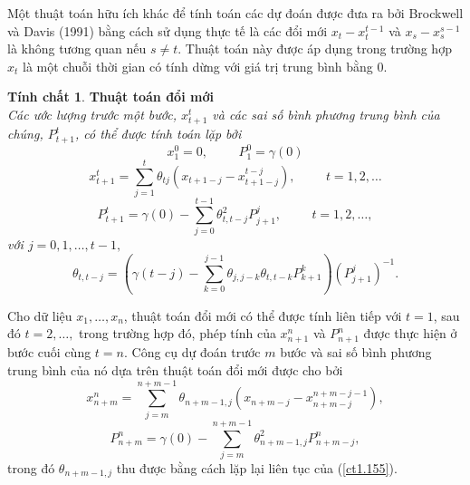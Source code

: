\documentclass[12pt, a4paper,oneside]{book}
\theoremstyle{definition}
\newtheorem{tc}[theo]{Tính chất}
\begin{document}
Một thuật toán hữu ích khác để tính toán các dự đoán được đưa ra bởi Brockwell và Davis (1991) bằng cách sử dụng thực tế là các đổi mới $x_{t} - x_{t}^{t-1}$ và $x_{s} - x_{s}^{s-1}$ là không tương quan nếu $s \neq t$. Thuật toán này được áp dụng trong trường hợp $x_{t}$ là một chuỗi thời gian có tính dừng với giá trị trung bình bằng $0$.
\begin{tc}\cite{8} \textbf{Thuật toán đổi mới}\\
	\textit{Các ước lượng trước một bước, $x_{t+1}^{t}$ và các sai số bình phương trung bình của chúng, $P_{t+1}^{t}$, có thể được tính toán lặp bởi
		$$x_{1}^{0}=0, \hspace{1cm} P_{1}^{0} =\gamma(0) $$
		\begin{equation}
		x_{t+1}^{t} = \sum_{j=1}^{t}\theta_{tj}(x_{t+1-j} - x_{t+1-j}^{t-j}), \hspace{1cm} t= 1,2, \dots \label{ct1.153}
		\end{equation}	
		\begin{equation}
		P_{t+1}^{t} = \gamma(0) - \sum_{j=0}^{t-1}\theta^{2}_{t,t-j}P_{j+1}^{j}, \hspace{1cm}  t=1, 2, \dots,\label{ct1.154}
		\end{equation}
		với $j=0, 1, \dots, t-1,$
		\begin{equation}
		\theta_{t,t-j}= (\gamma(t-j) - \sum_{k=0}^{j-1}\theta_{j,j-k}\theta_{t,t-k}P_{k+1}^{k})(P_{j+1}^{j})^{-1}.\label{ct1.155}
		\end{equation}}
\end{tc}

Cho dữ liệu $x_{1}, \dots, x_{n}$, thuật toán đổi mới có thể được tính liên tiếp với $t = 1$, sau đó $t = 2, \dots,$ trong trường hợp đó, phép tính của $x^{n}_{n+1}$ và $P^{n}_{n+1}$ được thực hiện ở bước cuối cùng $t = n$. Công cụ dự đoán trước $m$ bước và sai số bình phương trung bình của nó dựa trên thuật toán đổi mới được cho bởi
\begin{equation}
x_{n+m}^{n} = \sum_{j=m}^{n+m-1}\theta_{n+m-1,j}(x_{n+m-j}- x^{n+m-j-1}_{n+m-j}), \label{ct1.156}
\end{equation}
\begin{equation}
P_{n+m}^{n}=  \gamma(0) - \sum_{j=m}^{n+m-1}\theta^{2}_{n+m-1,j}P_{n+m-j}^{n}, \label{ct1.157}
\end{equation}	
trong đó $\theta_{n+m-1,j}$ thu được bằng cách lặp lại liên tục của (\ref{ct1.155}).
\end{document}
